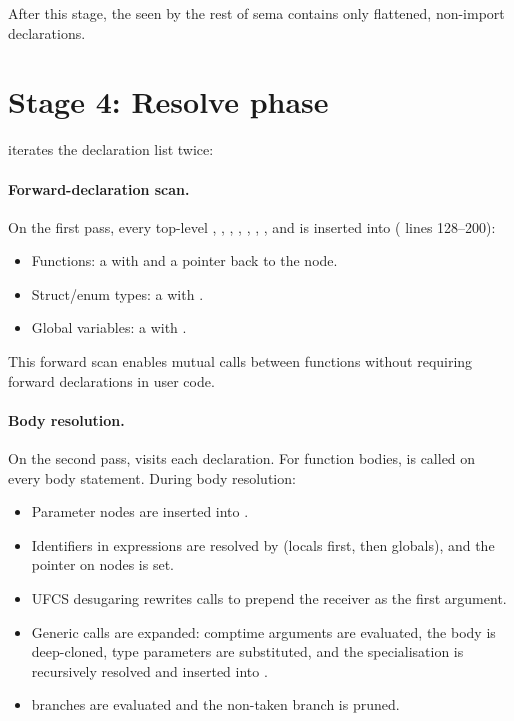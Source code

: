 \pnum
After this stage, the  seen by the rest of sema contains only
flattened, non-import declarations.

\section{Stage 4: Resolve phase}
\label{sec:df-resolve}

\pnum
{} iterates the declaration list twice:

\paragraph{Forward-declaration scan.}
On the first pass, every top-level ,
, , ,
, ,
, and  is inserted into
 ( lines 128–200):
\begin{itemize}
\item Functions: a  with  and a
  pointer back to the  node.
\item Struct/enum types: a  with .
\item Global variables: a  with .
\end{itemize}

\noindent
This forward scan enables mutual calls between functions without requiring
forward declarations in user code.

\paragraph{Body resolution.}
On the second pass,  visits each declaration.
For function bodies,  is called on every body
statement.  During body resolution:
\begin{itemize}
\item Parameter  nodes are inserted into
  .
\item Identifiers in expressions are resolved by  (locals
  first, then globals), and the  pointer on  nodes is
  set.
\item UFCS desugaring rewrites  calls to prepend the
  receiver as the first argument.
\item Generic calls are expanded: comptime arguments are evaluated, the body
  is deep-cloned, type parameters are substituted, and the specialisation is
  recursively resolved and inserted into .
\item {} branches are evaluated and the non-taken branch is
  pruned.
\end{itemize}

